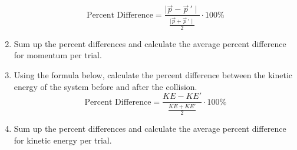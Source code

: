 \documentclass{article}
\theoremstyle{definition}
\begin{document}
\begin{enumerate}
\begin{equation}
        \text{Percent Difference} = \frac{\mid \!\vec{p} - \vec{p}\,' \!\!\mid}{\frac{\mid \vec{p} + \vec{p}\,' \!\mid}{2}} \cdot 100\%
    \end{equation}
    \item Sum up the percent differences and calculate the average percent difference for momentum per trial.
    \item Using the formula below, calculate the percent difference between the kinetic energy of the system before and after the collision. \begin{equation}
        \text{Percent Difference} = \frac{K\!E - K\!E'}{\frac{K\!E + K\!E'}{2}} \cdot 100\% 
    \end{equation}
    \item Sum up the percent differences and calculate the average percent difference for kinetic energy per trial.

\end{enumerate}
\end{document}
